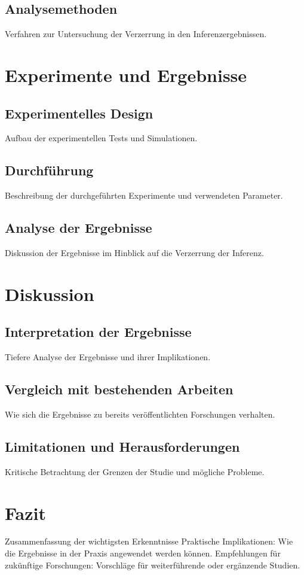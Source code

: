 \documentclass[%
thesis=student,%
coverpage=false,%
titlepage=false,%
headmarks=true, %
german,%
font=libertine, %
math=newpxtx, %
BCOR=5mm,%
coverBCOR=11mm%
]{tumbook}
\theoremstyle{break}
\begin{document}
\section{Analysemethoden}
Verfahren zur Untersuchung der Verzerrung in den Inferenzergebnissen.

\chapter{Experimente und Ergebnisse}
\section{Experimentelles Design}
Aufbau der experimentellen Tests und Simulationen.
\section{Durchführung}
Beschreibung der durchgeführten Experimente und verwendeten Parameter.
\section{Analyse der Ergebnisse}
Diskussion der Ergebnisse im Hinblick auf die Verzerrung der Inferenz.

\chapter{Diskussion}
\section{Interpretation der Ergebnisse}
Tiefere Analyse der Ergebnisse und ihrer Implikationen.
\section{Vergleich mit bestehenden Arbeiten}
Wie sich die Ergebnisse zu bereits veröffentlichten Forschungen verhalten.
\section{Limitationen und Herausforderungen}
Kritische Betrachtung der Grenzen der Studie und mögliche Probleme.
\chapter{Fazit}
Zusammenfassung der wichtigsten Erkenntnisse
Praktische Implikationen: Wie die Ergebnisse in der Praxis angewendet werden können.
Empfehlungen für zukünftige Forschungen: Vorschläge für weiterführende oder ergänzende Studien.
\end{document}

